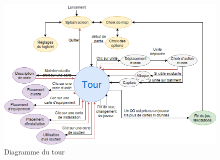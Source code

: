 \begin{figure}[h]
    \centering
    \includegraphics[scale =0.65]{images/etatsDeJeu.png}
    \caption{Diagramme du tour}
    \label{fig:Advance Wars}
\end{figure}


